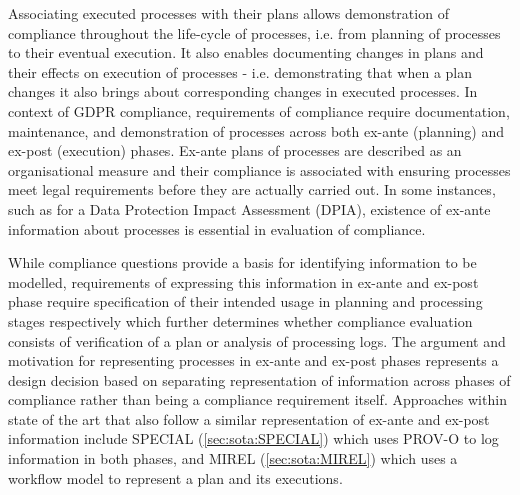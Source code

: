 Associating executed processes with their plans allows demonstration of compliance throughout the life-cycle of processes, i.e. from planning of processes to their eventual execution. It also enables documenting changes in plans and their effects on execution of processes - i.e. demonstrating that when a plan changes it also brings about corresponding changes in executed processes. In context of GDPR compliance, requirements of compliance require documentation, maintenance, and demonstration of processes across both ex-ante (planning) and ex-post (execution) phases. Ex-ante plans of processes are described as an organisational measure and their compliance is associated with ensuring processes meet legal requirements before they are actually carried out. In some instances, such as for a Data Protection Impact Assessment (DPIA), existence of ex-ante information about processes is essential in evaluation of compliance.

While compliance questions provide a basis for identifying information to be modelled, requirements of expressing this information in ex-ante and ex-post phase require specification of their intended usage in planning and processing stages respectively which further determines whether compliance evaluation consists of verification of a plan or analysis of processing logs. 
The argument and motivation for representing processes in ex-ante and ex-post phases represents a design decision based on separating representation of information across phases of compliance rather than being a compliance requirement itself.
Approaches within state of the art that also follow a similar representation of ex-ante and ex-post information include SPECIAL (\autoref{sec:sota:SPECIAL}) which uses PROV-O to log information in both phases, and MIREL (\autoref{sec:sota:MIREL}) which uses a workflow model to represent a plan and its executions.

